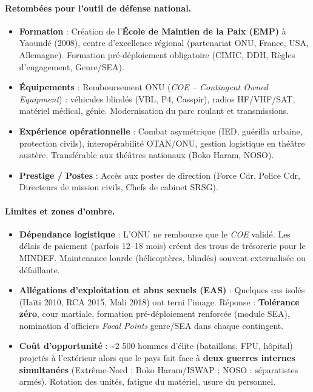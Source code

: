 \documentclass[11pt]{article}
\begin{document}
\paragraph{Retombées pour l'outil de défense national.}
\begin{itemize}
    \item \textbf{Formation} : Création de l'\textbf{École de Maintien de la Paix (EMP)} à Yaoundé (2008), centre d'excellence régional (partenariat ONU, France, USA, Allemagne). Formation pré-déploiement obligatoire (CIMIC, DDH, Règles d'engagement, Genre/SEA).
    \item \textbf{Équipements} : Remboursement ONU (\emph{COE -- Contingent Owned Equipment}) : véhicules blindés (VBL, P4, Casspir), radios HF/VHF/SAT, matériel médical, génie. Modernisation du parc roulant et transmissions.
    \item \textbf{Expérience opérationnelle} : Combat asymétrique (IED, guérilla urbaine, protection civils), interopérabilité OTAN/ONU, gestion logistique en théâtre austère. Transférable aux théâtres nationaux (Boko Haram, NOSO).
    \item \textbf{Prestige / Postes} : Accès aux postes de direction (Force Cdr, Police Cdr, Directeurs de mission civils, Chefs de cabinet SRSG).
\end{itemize}

\paragraph{Limites et zones d'ombre.}
\begin{itemize}
    \item \textbf{Dépendance logistique} : L'ONU ne rembourse que le \emph{COE} validé. Les délais de paiement (parfois 12--18 mois) créent des trous de trésorerie pour le MINDEF. Maintenance lourde (hélicoptères, blindés) souvent externalisée ou défaillante.
    \item \textbf{Allégations d'exploitation et abus sexuels (EAS)} : Quelques cas isolés (Haïti 2010, RCA 2015, Mali 2018) ont terni l'image. Réponse : \textbf{Tolérance zéro}, cour martiale, formation pré-déploiement renforcée (module SEA), nomination d'officiers \emph{Focal Points} genre/SEA dans chaque contingent.
    \item \textbf{Coût d'opportunité} : \textasciitilde 2 500 hommes d'élite (bataillons, FPU, hôpital) projetés à l'extérieur alors que le pays fait face à \textbf{deux guerres internes simultanées} (Extrême-Nord : Boko Haram/ISWAP ; NOSO : séparatistes armés). Rotation des unités, fatigue du matériel, usure du personnel.
\end{itemize}
\end{document}
